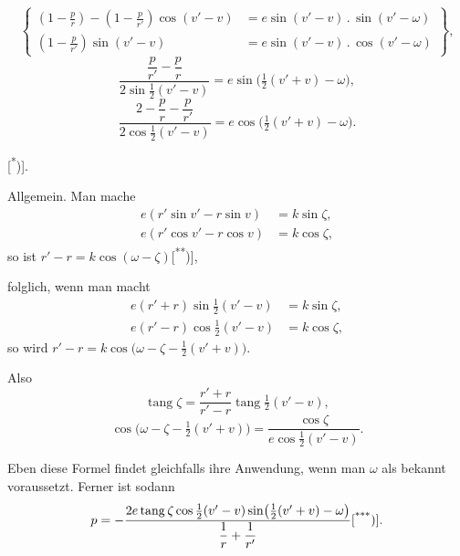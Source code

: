 \clearpage
{}
\[
\left\{\begin{aligned}
\left(1-\frac pr\right)-\left(1-\frac p{r'}\right)\cos(v'-v)
&=e\sin(v'-v)\mathbin{.}\sin(v'-\omega)\\
\left(1-\frac p{r'}\right)\sin(v'-v)
&=e\sin(v'-v)\mathbin{.}\cos(v'-\omega)
\end{aligned}\right\},
\]
\[
\frac{\dfrac p{r'}-\dfrac pr}{2\sin\frac12(v'-v)}=e\sin\bigl(\tfrac12(v'+v)-\omega\bigr),
\]
\[
\frac{2-\dfrac pr-\dfrac p{r'}}{2\cos\frac12(v'-v)}=e\cos\bigl(\tfrac12(v'+v)-\omega\bigr).
\]
\begin{center}
\textup{[\textsuperscript{*})]}.
\end{center}
\begingroup\renewcommand{\thefootnote}{}\endgroup
\noindent\hspace*{\parindent}Allgemein. Man mache
\[
\begin{aligned}
e(r'\sin v'-r\sin v)&=k\sin\zeta,\\
e(r'\cos v'-r\cos v)&=k\cos\zeta,
\end{aligned}
\]
\noindent so ist $r'-r=k\cos(\omega-\zeta)$\textup{[\textsuperscript{**})]},
\begingroup\renewcommand{\thefootnote}{}\endgroup
\par\noindent folglich, wenn man macht
\[
\begin{aligned}
e(r'+r)\sin\tfrac12(v'-v)&=k\sin\zeta,\\
e(r'-r)\cos\tfrac12(v'-v)&=k\cos\zeta,
\end{aligned}
\]
\noindent so wird $r'-r=k\cos\bigl(\omega-\zeta-\tfrac12(v'+v)\bigr)$.
\par\noindent Also
\[
\operatorname{tang}\zeta=\frac{r'+r}{r'-r}\operatorname{tang}\tfrac12(v'-v),
\]
\[
\cos\bigl(\omega-\zeta-\tfrac12(v'+v)\bigr)=\frac{\cos\zeta}{e\cos\frac12(v'-v)}.
\]
\noindent{\small [S. 5]}\par
\noindent Eben diese Formel findet gleichfalls ihre Anwendung, wenn man $\omega$ als bekannt voraussetzt. Ferner ist sodann
\[
p=-\frac{2e\operatorname{tang}\zeta\cos\frac12(v'-v)\sin\bigl(\frac12(v'+v)-\omega\bigr)}
{\dfrac1r+\dfrac1{r'}}\text{[\textsuperscript{***})]}.
\]
\begingroup\renewcommand{\thefootnote}{}\endgroup
